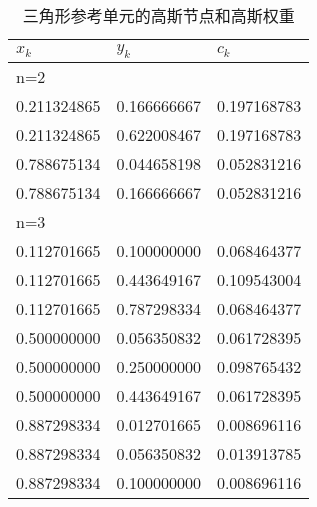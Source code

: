 \begin{table}[H]
	\centering
	\caption{三角形参考单元的高斯节点和高斯权重}
	\label{table01}
	\begin{tabular}{lll}
	\hline $ x_{k} $ & $ y_{k} $ & $ c_{k} $ \\
	\hline n=2 & & \\
	0.211324865 & 0.166666667 & 0.197168783 \\
	0.211324865 & 0.622008467 & 0.197168783 \\
	0.788675134 & 0.044658198 & 0.052831216 \\
	0.788675134 & 0.166666667 & 0.052831216 \\
	n=3 & & \\
	0.112701665 & 0.100000000 & 0.068464377 \\
	0.112701665 & 0.443649167 & 0.109543004 \\
	0.112701665 & 0.787298334 & 0.068464377 \\
	0.500000000 & 0.056350832 & 0.061728395 \\
	0.500000000 & 0.250000000 & 0.098765432 \\
	0.500000000 & 0.443649167 & 0.061728395 \\
	0.887298334 & 0.012701665 & 0.008696116 \\
	0.887298334 & 0.056350832 & 0.013913785 \\
	0.887298334 & 0.100000000 & 0.008696116 \\
	\hline
\end{tabular}
\end{table}